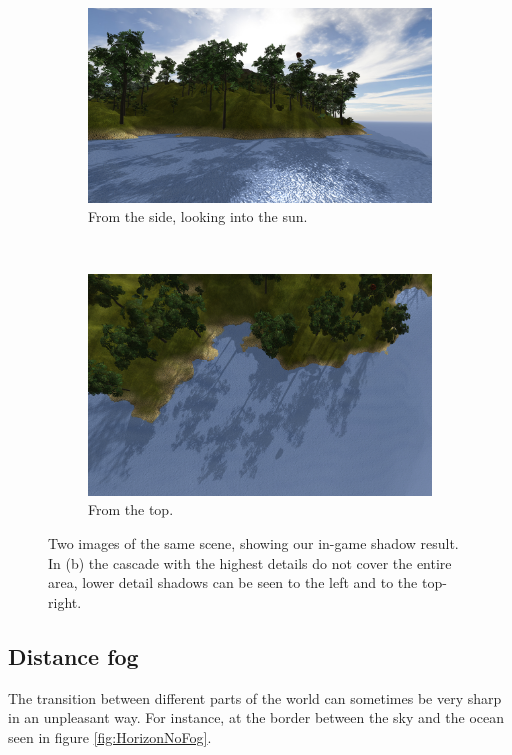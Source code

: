 \begin{figure}[H]
\begin{subfigure}{.9\textwidth}
  \centering
  \includegraphics[width=0.9\linewidth]{images/shadows1.jpg}
  \caption{From the side, looking into the sun.}
  \label{fig:shadows1}
\end{subfigure}%
\\
\begin{subfigure}{.9\textwidth}
  \centering
  \includegraphics[width=0.9\linewidth]{images/shadows2.jpg}
  \caption{From the top.}
  \label{fig:shadows2}
\end{subfigure}
\caption{Two images of the same scene, showing our in-game shadow result. In (b) the cascade with the highest details do not cover the entire area, lower detail shadows can be seen to the left and to the top-right.}
\label{fig:InGameShadowResult}
\end{figure}

\newpage
\subsection{Distance fog}
The transition between different parts of the world can sometimes be very sharp in an unpleasant way. For instance, at the border between the sky and the ocean seen in figure \ref{fig:HorizonNoFog}. 

